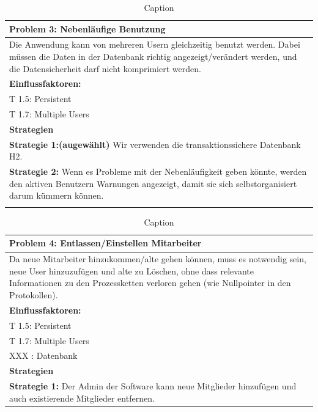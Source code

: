 \documentclass[enabledeprecatedfontcommands,fontsize=12pt,paper=a4,twoside]{scrartcl}
\begin{document}
\begin{table}[H]
    \centering
    \begin{tabular}{|p{15cm}|}
    \hline
          \textbf{Problem 3:} Nebenläufige Benutzung  \\ \hline %
          Die Anwendung kann von mehreren Usern gleichzeitig benutzt werden. Dabei müssen die Daten in der Datenbank richtig angezeigt/verändert werden, und die Datensicherheit darf nicht komprimiert werden. \\ \hline
          \textbf{Einflussfaktoren: } \\
          T 1.5: Persistent \\
          T 1.7: Multiple Users\\
          \hline
          \textbf{Strategien} \\ \hline
          \textbf{Strategie 1:(augewählt)} Wir verwenden die transaktionssichere Datenbank H2. \\
          \textbf{Strategie 2:} Wenn es Probleme mit der Nebenläufigkeit geben könnte, werden den aktiven Benutzern Warnungen angezeigt, damit sie sich selbstorganisiert darum kümmern können. \\
          \\ \hline
    \end{tabular}

    \caption{Caption}
    \label{tab:my_label}
\end{table}

\begin{table}[H]
    \centering
    \begin{tabular}{|p{15cm}|}
    \hline
          \textbf{Problem 4:} Entlassen/Einstellen Mitarbeiter \\ \hline %
          Da neue Mitarbeiter hinzukommen/alte gehen können, muss es notwendig sein, neue User hinzuzufügen und alte zu Löschen, ohne dass relevante Informationen zu den Prozessketten verloren gehen (wie Nullpointer in den Protokollen).
          \\ \hline
          \textbf{Einflussfaktoren: } \\
          T 1.5: Persistent \\
          T 1.7: Multiple Users\\

          XXX : Datenbank \\
          \hline
          \textbf{Strategien} \\ \hline
          \textbf{Strategie 1:} Der Admin der Software kann neue Mitglieder hinzufügen und auch existierende Mitglieder entfernen.
          \\ \hline
    \end{tabular}

    \caption{Caption}
    \label{tab:my_label}
\end{table}
\end{document}
